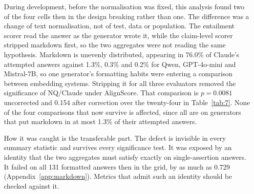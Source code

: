 \label{sec:normalisation}

During development, before the normalisation was fixed, this analysis found two of the four cells then in the design breaking rather than one. The difference was a change of text normalisation, not of test, data or population. The entailment scorer read the answer as the generator wrote it, while the claim-level scorer stripped markdown first, so the two aggregates were not reading the same hypothesis. Markdown is unevenly distributed, appearing in 76.0\% of Claude's attempted answers against 1.3\%, 0.3\% and 0.2\% for Qwen, GPT-4o-mini and Mistral-7B, so one generator's formatting habits were entering a comparison between embedding systems. Stripping it for all three evaluators removed the significance of NQ/Claude under AlignScore. That comparison is $p = 0.0081$ uncorrected and 0.154 after correction over the twenty-four in Table~\ref{tab:7}. None of the four comparisons that now survive is affected, since all are on generators that put markdown in at most 1.3\% of their attempted answers.

How it was caught is the transferable part. The defect is invisible in every summary statistic and survives every significance test. It was exposed by an identity that the two aggregates must satisfy exactly on single-assertion answers. It failed on all 131 formatted answers then in the grid, by as much as 0.729 (Appendix~\ref{app:markdown}). Metrics that admit such an identity should be checked against it.
